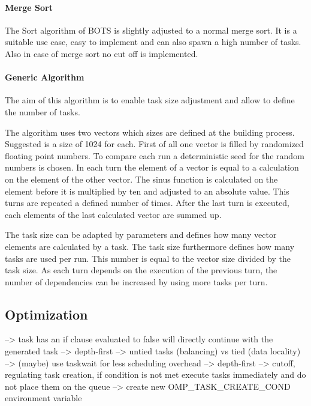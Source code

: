   \paragraph{Merge Sort}
  The Sort algorithm of BOTS is slightly adjusted to a normal merge sort.
  It is a suitable use case, easy to implement and can also spawn a high number of tasks.
  Also in case of merge sort no cut off is implemented.
  \\
  
  \paragraph{Generic Algorithm}
  The aim of this algorithm is to enable task size adjustment and allow to define the number of tasks.
  
  The algorithm uses two vectors which sizes are defined at the building process.
  Suggested is a size of 1024 for each.
  First of all one vector is filled by randomized floating point numbers.
  To compare each run a deterministic seed for the random numbers is chosen.
  In each turn the element of a vector is equal to a calculation on the element of the other vector.
  The sinus function is calculated on the element before it is multiplied by ten and adjusted to an absolute value.
  This turns are repeated a defined number of times.
  After the last turn is executed, each elements of the last calculated vector are summed up.
  
  The task size can be adapted by parameters and defines how many vector elements are calculated by a task.
  The task size furthermore defines how many tasks are used per run.
  This number is equal to the vector size divided by the task size.
  As each turn depends on the execution of the previous turn, the number of dependencies can be increased by using more tasks per turn.
		
\subsection{Optimization}
	
	\cite{LaGrone.2011}
	--> task has an if clause evaluated to false will directly continue with the generated task --> depth-first
	--> untied tasks (balancing) vs tied (data locality)
	--> (maybe) use taskwait for less scheduling overhead --> depth-first
	--> cutoff, regulating task creation, if condition is not met execute tasks immediately and do not place them on the queue
		--> create new OMP\_TASK\_CREATE\_COND environment variable
		
